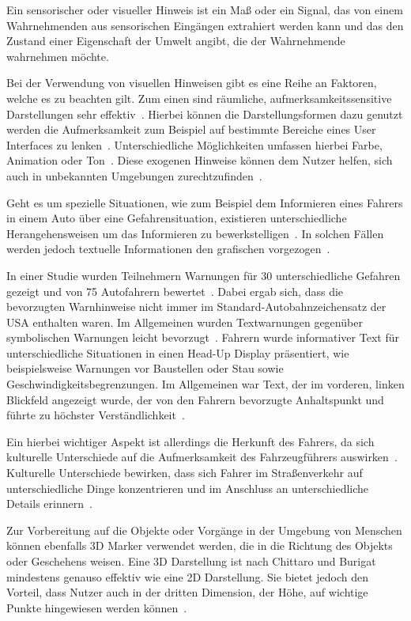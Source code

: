Ein sensorischer oder visueller Hinweis ist ein Maß oder ein Signal, das von einem Wahrnehmenden aus sensorischen Eingängen extrahiert werden kann und das den Zustand einer Eigenschaft der Umwelt angibt, die der Wahrnehmende wahrnehmen möchte.

Bei der Verwendung von visuellen Hinweisen gibt es eine Reihe an Faktoren, welche es zu beachten gilt. Zum einen sind räumliche, aufmerksamkeitssensitive Darstellungen sehr effektiv~\cite{bonanni2005attention}. Hierbei können die Darstellungsformen dazu genutzt werden die Aufmerksamkeit zum Beispiel auf bestimmte Bereiche eines User Interfaces zu lenken~\cite{keller1994visual}. Unterschiedliche Möglichkeiten umfassen hierbei Farbe, Animation oder Ton~\cite{keller1994visual}. Diese exogenen Hinweise können dem Nutzer helfen, sich auch in unbekannten Umgebungen zurechtzufinden~\cite{bonanni2005attention}.

Geht es um spezielle Situationen, wie zum Beispiel dem Informieren eines Fahrers in einem Auto über eine Gefahrensituation, existieren unterschiedliche Herangehensweisen um das Informieren zu bewerkstelligen~\cite{keller1994visual}. In solchen Fällen werden jedoch textuelle Informationen den grafischen vorgezogen~\cite{green1995driver}.

In einer Studie wurden Teilnehmern Warnungen für 30 unterschiedliche Gefahren gezeigt und von 75 Autofahrern bewertet~\cite{green1995driver}. 
Dabei ergab sich, dass die bevorzugten Warnhinweise nicht immer im Standard-Autobahnzeichensatz der USA enthalten waren. 
Im Allgemeinen wurden Textwarnungen gegenüber symbolischen Warnungen leicht bevorzugt~\cite{green1995driver}.
Fahrern wurde informativer Text für unterschiedliche Situationen in einen Head-Up Display präsentiert, wie beispielsweise Warnungen vor Baustellen oder Stau sowie Geschwindigkeitsbegrenzungen. 
Im Allgemeinen war Text, der im vorderen, linken Blickfeld angezeigt wurde, der von den Fahrern bevorzugte Anhaltspunkt und führte zu höchster Verständlichkeit~\cite{green1995driver}.

Ein hierbei wichtiger Aspekt ist allerdings die Herkunft des Fahrers, da sich kulturelle Unterschiede auf die Aufmerksamkeit des Fahrzeugführers auswirken~\cite{shinohara2017visual}.
Kulturelle Unterschiede bewirken, dass sich Fahrer im Straßenverkehr auf unterschiedliche Dinge konzentrieren und im Anschluss an unterschiedliche Details erinnern~\cite{shinohara2017visual}.

Zur Vorbereitung auf die Objekte oder Vorgänge in der Umgebung von Menschen können ebenfalls 3D Marker verwendet werden, die in die Richtung des Objekts oder Geschehens weisen. Eine 3D Darstellung ist nach Chittaro und Burigat mindestens genauso effektiv wie eine 2D Darstellung. Sie bietet jedoch den Vorteil, dass Nutzer auch in der dritten Dimension, der Höhe, auf wichtige Punkte hingewiesen werden können~\cite{chittaro20043d}.
